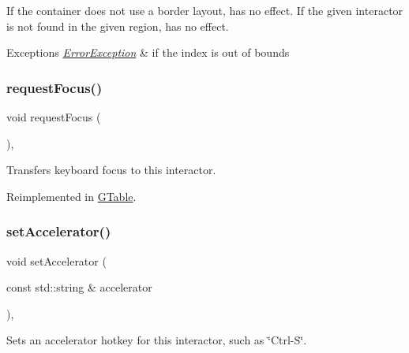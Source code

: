 If the container does not use a border layout, has no effect. If the given interactor is not found in the given region, has no effect. 
\begin{DoxyExceptions}{Exceptions}
{\em \mbox{\hyperlink{classErrorException}{Error\+Exception}}} & if the index is out of bounds \\
\hline
\end{DoxyExceptions}
\mbox{\label{classGInteractor_a519fb2ac767f8b2febbb50b898b8c8cb}} 
\subsubsection{\texorpdfstring{request\+Focus()}{requestFocus()}}
{\footnotesize\ttfamily void request\+Focus (\begin{DoxyParamCaption}{ }\end{DoxyParamCaption})\hspace{0.3cm}{\ttfamily [virtual]}, {\ttfamily [inherited]}}



Transfers keyboard focus to this interactor. 



Reimplemented in \mbox{\hyperlink{classGTable_a49b39e0eeaf5af829e8956e9055c5cdc}{G\+Table}}.

\mbox{\label{classGInteractor_ad15f102f62e2960576012f1aa0ba4b2e}} 
\subsubsection{\texorpdfstring{set\+Accelerator()}{setAccelerator()}}
{\footnotesize\ttfamily void set\+Accelerator (\begin{DoxyParamCaption}\item[{const std\+::string \&}]{accelerator }\end{DoxyParamCaption})\hspace{0.3cm}{\ttfamily [virtual]}, {\ttfamily [inherited]}}



Sets an accelerator hotkey for this interactor, such as \char`\"{}\+Ctrl-\/\+S\char`\"{}. 


